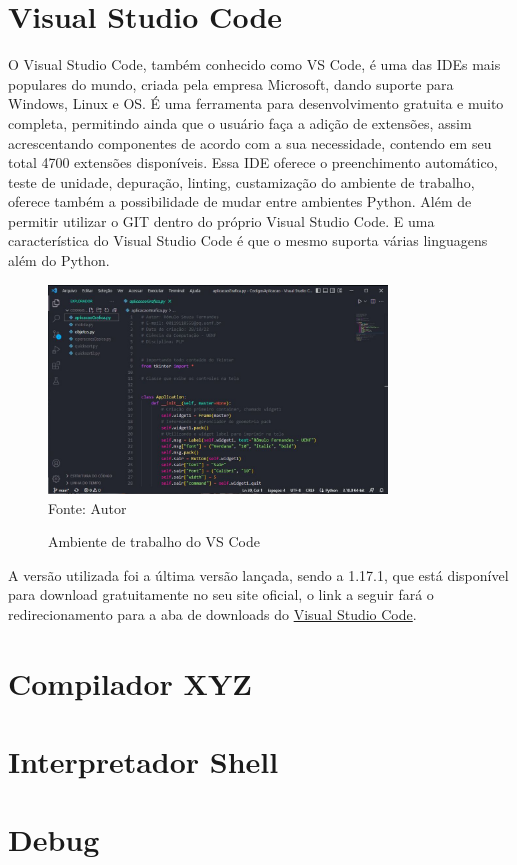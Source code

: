     \section{Visual Studio Code}
	O Visual Studio Code, também conhecido como VS Code, é uma das IDEs mais populares do mundo, criada pela empresa Microsoft, dando suporte para Windows, Linux e OS. É uma ferramenta para desenvolvimento gratuita e muito completa, permitindo ainda que o usuário faça a adição de extensões, assim acrescentando componentes de acordo com a sua necessidade, contendo em seu total 4700 extensões disponíveis. Essa IDE oferece o preenchimento automático, teste de unidade, depuração, linting, custamização do ambiente de trabalho, oferece também a possibilidade de mudar entre ambientes Python. Além de permitir utilizar o GIT dentro do próprio Visual Studio Code. E uma característica do Visual Studio Code é que o mesmo suporta várias linguagens além do Python.
    
    \begin{figure}[H]
    	\begin{center}
    		\caption{Ambiente de trabalho do VS Code} \label{ling1}
    		\includegraphics[width=9cm]{vscode.JPG} \\
    		{\tiny \sf Fonte:{ Autor}}
    	\end{center}
    \end{figure}
    
    A versão utilizada foi a última versão lançada, sendo a 1.17.1, que está disponível para download gratuitamente no seu site oficial, o link a seguir fará o redirecionamento para a aba de downloads do \href{https://code.visualstudio.com}{Visual Studio Code}.
    
    \section{Compilador XYZ}


    \section{Interpretador Shell}

   
    \section{Debug}
     